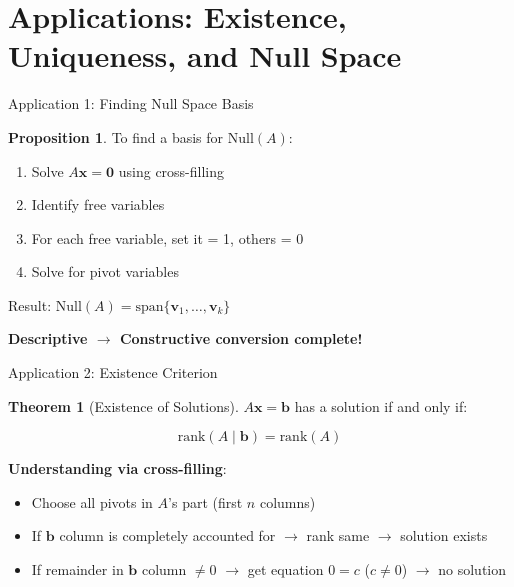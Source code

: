 \documentclass[10pt]{beamer}
\theoremstyle{definition}
\newtheorem{prop}{Proposition}[section]
\newtheorem{thm}{Theorem}[section]
\newcommand{\x}[1]{\alert{\textbf{#1}}}
\begin{document}
\section{Applications: Existence, Uniqueness, and Null Space}

\begin{frame}{Application 1: Finding Null Space Basis}

\begin{prop}
To find a basis for $\text{Null}(A)$:

\begin{enumerate}
\item Solve $A\mathbf{x} = \mathbf{0}$ using cross-filling
\item Identify free variables
\item For each free variable, set it = 1, others = 0
\item Solve for pivot variables
\end{enumerate}

Result: $\text{Null}(A) = \text{span}\{\mathbf{v}_1, \ldots, \mathbf{v}_k\}$

\x{Descriptive $\to$ Constructive conversion complete!}
\end{prop}

\end{frame}

\begin{frame}{Application 2: Existence Criterion}

\begin{thm}[Existence of Solutions]
$A\mathbf{x} = \mathbf{b}$ has a solution if and only if:

$$\text{rank}(A \mid \mathbf{b}) = \text{rank}(A)$$
\end{thm}

\vspace{1em}

\x{Understanding via cross-filling}:

\begin{itemize}
\item Choose all pivots in $A$'s part (first $n$ columns)
\item If $\mathbf{b}$ column is completely accounted for $\to$ rank same $\to$ solution exists
\item If remainder in $\mathbf{b}$ column $\neq 0$ $\to$ get equation $0 = c$ ($c \neq 0$) $\to$ no solution
\end{itemize}

\end{frame}
\end{document}
